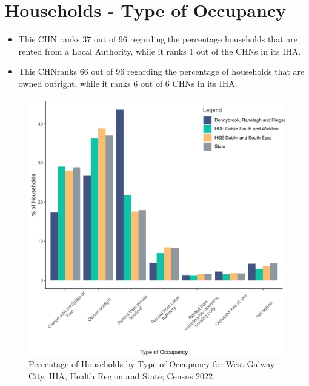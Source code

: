 \documentclass{article}
\begin{document}
\section{Households - Type of Occupancy}\label{sect:Households}
\begin{itemize}
\item This CHN ranks  37 out of 96 regarding the percentage households that are rented from a Local Authority, while it ranks  1 out of the CHNs in its IHA. 
\item This CHNranks  66 out of 96 regarding the percentage of households that are owned outright, while it ranks   6 out of 6 CHNs in its IHA.
\end{itemize}
\begin{figure}[H]
	\centering
	\includegraphics[width = 140mm]{../figures/HouseholdsED.pdf}
	\caption{Percentage of Households by Type of Occupancy for West Galway City, IHA, Health Region and State; Census 2022.}
	\label{fig:vbnv}
	\end{figure}
\end{document}
